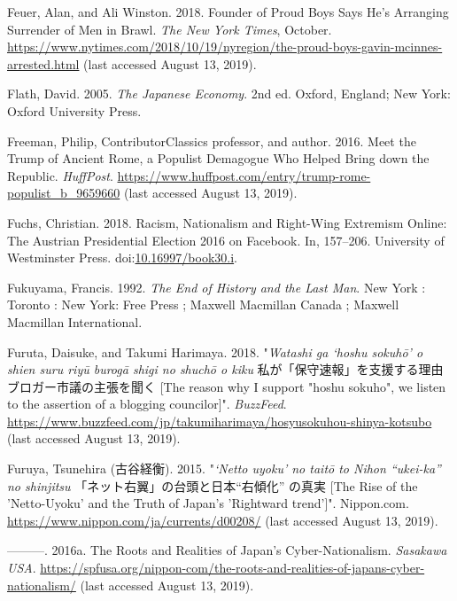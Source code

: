 \documentclass[10pt,british,A4paper,twoside]{memoir}
\begin{document}
\hypertarget{ref-feuer_founder_2018}{}
Feuer, Alan, and Ali Winston. 2018. Founder of Proud Boys Says He's
Arranging Surrender of Men in Brawl. \emph{The New York Times}, October.
\url{https://www.nytimes.com/2018/10/19/nyregion/the-proud-boys-gavin-mcinnes-arrested.html} (last accessed August 13, 2019).

\hypertarget{ref-flath_japanese_2005}{}
Flath, David. 2005. \emph{The Japanese Economy}. 2nd ed. Oxford,
England; New York: Oxford University Press.

\hypertarget{ref-freeman_meet_2016}{}
Freeman, Philip, ContributorClassics professor, and author. 2016. Meet
the Trump of Ancient Rome, a Populist Demagogue Who Helped Bring down
the Republic. \emph{HuffPost}.
\url{https://www.huffpost.com/entry/trump-rome-populist_b_9659660} (last accessed August 13, 2019).

\hypertarget{ref-fuchs_racism_2018}{}
Fuchs, Christian. 2018. Racism, Nationalism and Right-Wing Extremism
Online: The Austrian Presidential Election 2016 on Facebook. In,
157--206. University of Westminster Press.
doi:\href{https://doi.org/10.16997/book30.i}{10.16997/book30.i}.

\hypertarget{ref-fukuyama_end_1992}{}
Fukuyama, Francis. 1992. \emph{The End of History and the Last Man}. New
York : Toronto : New York: Free Press ; Maxwell Macmillan Canada ;
Maxwell Macmillan International.

\hypertarget{ref-furuta_eng:_2018}{}
Furuta, Daisuke, and Takumi Harimaya. 2018. "\emph{Watashi ga `hoshu sokuhō' o shien suru riyū burogā shigi no shuchō o kiku} 私が「保守速報」を支援する理由 ブロガー市議の主張を聞く [The reason why I support "hoshu sokuho", we listen to the assertion of a blogging councilor]". \emph{BuzzFeed}.
\url{https://www.buzzfeed.com/jp/takumiharimaya/hosyusokuhou-shinya-kotsubo} (last accessed August 13, 2019).

\hypertarget{ref-furuya_eng._2015}{}
Furuya, Tsunehira (古谷経衡). 2015. "\emph{`Netto uyoku' no taitō to Nihon “ukei-ka” no shinjitsu} 「ネット右翼」の台頭と日本“右傾化” の真実 [The Rise of the 'Netto-Uyoku' and the Truth of Japan's 'Rightward trend']". Nippon.com.
\url{https://www.nippon.com/ja/currents/d00208/} (last accessed August 13, 2019).

\hypertarget{ref-furuya_roots_2016}{}
---------. 2016a. The Roots and Realities of Japan's
Cyber-Nationalism. \emph{Sasakawa USA}.
\url{https://spfusa.org/nippon-com/the-roots-and-realities-of-japans-cyber-nationalism/} (last accessed August 13, 2019).
\end{document}
